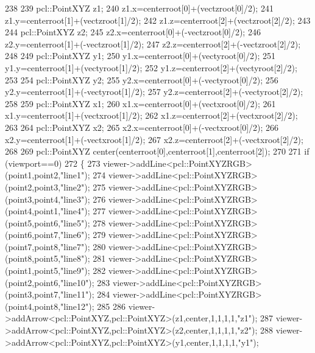 \begin{DoxyCode}
238 
239     pcl::PointXYZ z1;
240     z1.x=centerroot[0]+(vectzroot[0]/2);
241     z1.y=centerroot[1]+(vectzroot[1]/2);
242     z1.z=centerroot[2]+(vectzroot[2]/2);
243 
244     pcl::PointXYZ z2;
245     z2.x=centerroot[0]+(-vectzroot[0]/2);
246     z2.y=centerroot[1]+(-vectzroot[1]/2);
247     z2.z=centerroot[2]+(-vectzroot[2]/2);
248 
249     pcl::PointXYZ y1;
250     y1.x=centerroot[0]+(vectyroot[0]/2);
251     y1.y=centerroot[1]+(vectyroot[1]/2);
252     y1.z=centerroot[2]+(vectyroot[2]/2);
253 
254     pcl::PointXYZ y2;
255     y2.x=centerroot[0]+(-vectyroot[0]/2);
256     y2.y=centerroot[1]+(-vectyroot[1]/2);
257     y2.z=centerroot[2]+(-vectyroot[2]/2);
258     
259     pcl::PointXYZ x1;
260     x1.x=centerroot[0]+(vectxroot[0]/2);
261     x1.y=centerroot[1]+(vectxroot[1]/2);
262     x1.z=centerroot[2]+(vectxroot[2]/2);
263 
264     pcl::PointXYZ x2;
265     x2.x=centerroot[0]+(-vectxroot[0]/2);
266     x2.y=centerroot[1]+(-vectxroot[1]/2);
267     x2.z=centerroot[2]+(-vectxroot[2]/2);
268 
269     pcl::PointXYZ center(centerroot[0],centerroot[1],centerroot[2]);
270 
271     \textcolor{keywordflow}{if} (viewport==0)
272     \{
273         viewer->addLine<pcl::PointXYZRGB>(point1,point2,\textcolor{stringliteral}{"line1"});
274         viewer->addLine<pcl::PointXYZRGB>(point2,point3,\textcolor{stringliteral}{"line2"});
275         viewer->addLine<pcl::PointXYZRGB>(point3,point4,\textcolor{stringliteral}{"line3"});
276         viewer->addLine<pcl::PointXYZRGB>(point4,point1,\textcolor{stringliteral}{"line4"});
277         viewer->addLine<pcl::PointXYZRGB>(point5,point6,\textcolor{stringliteral}{"line5"});
278         viewer->addLine<pcl::PointXYZRGB>(point6,point7,\textcolor{stringliteral}{"line6"});
279         viewer->addLine<pcl::PointXYZRGB>(point7,point8,\textcolor{stringliteral}{"line7"});
280         viewer->addLine<pcl::PointXYZRGB>(point8,point5,\textcolor{stringliteral}{"line8"});
281         viewer->addLine<pcl::PointXYZRGB>(point1,point5,\textcolor{stringliteral}{"line9"});
282         viewer->addLine<pcl::PointXYZRGB>(point2,point6,\textcolor{stringliteral}{"line10"});
283         viewer->addLine<pcl::PointXYZRGB>(point3,point7,\textcolor{stringliteral}{"line11"});
284         viewer->addLine<pcl::PointXYZRGB>(point4,point8,\textcolor{stringliteral}{"line12"});
285 
286         viewer->addArrow<pcl::PointXYZ,pcl::PointXYZ>(z1,center,1,1,1,1,\textcolor{stringliteral}{"z1"});
287         viewer->addArrow<pcl::PointXYZ,pcl::PointXYZ>(z2,center,1,1,1,1,\textcolor{stringliteral}{"z2"});
288         viewer->addArrow<pcl::PointXYZ,pcl::PointXYZ>(y1,center,1,1,1,1,\textcolor{stringliteral}{"y1"});

\end{DoxyCode}
